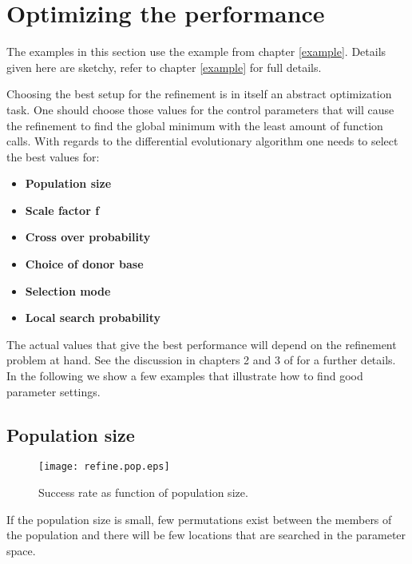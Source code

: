 \section{Optimizing the performance \label{diff-opti}}

The examples in this section use the example from chapter
\ref{example}. Details given here are sketchy, refer to chapter
\ref{example} for full details.

Choosing the best setup for the refinement is in itself an abstract 
optimization task. One should choose those values for the control
parameters that will cause the refinement to find the global minimum
with the least amount of function calls. With regards to the
differential evolutionary algorithm one needs to select the best 
values for:

\begin{itemize}
  \item {\bf Population size}
  \item {\bf Scale factor f}
  \item {\bf Cross over probability}
  \item {\bf Choice of donor base}
  \item {\bf Selection mode} 
  \item {\bf Local search probability}
\end{itemize}

The actual values that give the best performance will depend on the
refinement problem at hand. See the discussion in chapters 2 and 
3 of \cite{prstla2005} for a further details. In the following we
show a few examples that illustrate how to find good parameter 
settings.

\subsection{Population size}

\begin{figure}[htbp]
   \texttt{[image: refine.pop.eps]}
   \caption{Success rate as function of population size.}
   \label{evo-pop}
\end{figure}

If the population size is small, few permutations exist between the 
members of the population and there will be few locations that are
searched in the parameter space.

